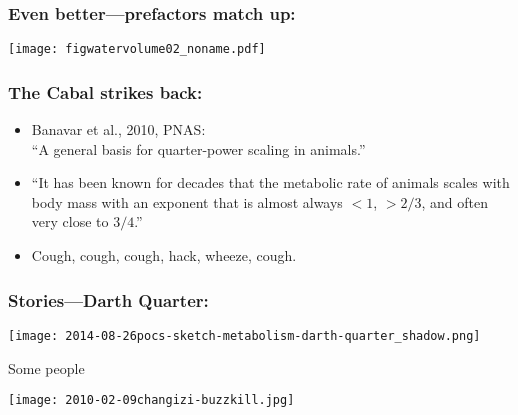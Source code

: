 \begin{frame}
  \frametitle{Even better---prefactors match up:}

  \begin{block}{}
  \begin{center}
    \texttt{[image: figwatervolume02\_noname.pdf]}
  \end{center}
  \end{block}

\end{frame}

\begin{frame}
  \frametitle{The Cabal strikes back:}

  \begin{block}{}
    \begin{itemize}
    \item<1-> 
      Banavar et al., 2010, PNAS:\\
      ``A general basis for quarter-power scaling in animals.''\cite{banavar2010a}
    \item<2->
      ``It has been known for decades that the metabolic 
      rate of animals scales with body mass with an exponent 
      that is almost always $<1$, $>2/3$, and often very close to $3/4$.''
    \item<3->
      Cough, cough, cough, hack, wheeze, cough.
    \end{itemize}
  \end{block}

\end{frame}

\begin{frame}
  \frametitle{Stories---Darth Quarter:}

  \texttt{[image: 2014-08-26pocs-sketch-metabolism-darth-quarter\_shadow.png]}
\end{frame}


\begin{frame}
  
  \begin{block}{Some people 
      }
    \begin{center}
      \texttt{[image: 2010-02-09changizi-buzzkill.jpg]}
    \end{center}
  \end{block}

\end{frame}

